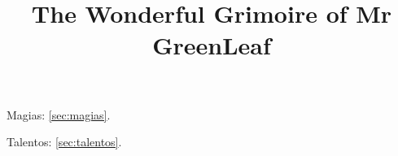 \documentclass[8pt, twocolumn]{article}
\author{}
\title{\vspace{-5em}The Wonderful Grimoire of Mr GreenLeaf}
\date{}%
\begin{document}
\setlength{\columnseprule}{0.4pt}
\maketitle
Magias: \ref{sec:magias}.

Talentos: \ref{sec:talentos}.




\end{document}
